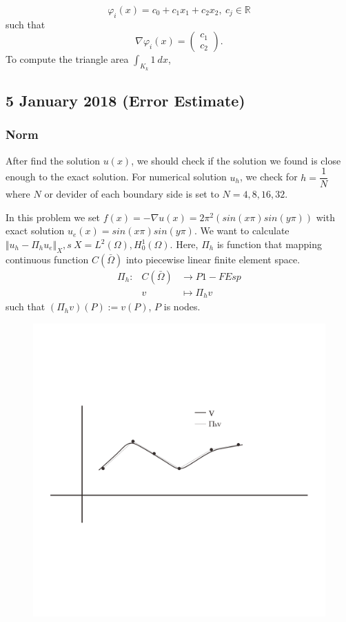 \documentclass[a4paper,10pt]{article}
\begin{document}
\[ \varphi_{i}(x) = c_{0} + c_{1}x_{1} +  c_{2}x_{2}, \ c_{j} \in \mathbb{R} \]
such that
\[ \nabla \varphi_{i}(x) = \begin{pmatrix}
c_{1} \\ c_{2}
\end{pmatrix}.  \]
To compute the triangle area $ \int_{K_{k}} 1 \ dx $,


\subsection{5 January 2018 (Error Estimate)}
\subsubsection{Norm}
After find the solution $ u(x) $, we should check if the solution we found is close enough to the exact solution. For numerical solution $ u_{h} $, we check for $ h = \dfrac{1}{N} $ where $ N $  or devider of each boundary side is set to $ N = 4,8,16,32 $.

In this problem we set $ f(x) = -\nabla u(x) = 2 \pi^2(sin(x\pi)sin(y\pi))$ with exact solution $ u_{e}(x) = sin(x\pi)sin(y\pi) $. We want to calculate $ \Vert u_{h}-\Pi_{h}u_{e} \Vert_{X} ,s \ X = L^2(\Omega), H_{0}^{1}(\Omega)$. Here, $ \Pi_{h} $ is function that mapping continuous function $ C(\bar{\Omega}) $ into piecewise linear finite element space.
\begin{eqnarray}\nonumber
\Pi_{h} : & C(\bar{\Omega}) & \rightarrow P1-FEsp \\ \nonumber
& v & \mapsto \Pi_{h}v
\end{eqnarray}
such that $ (\Pi_{h}v)(P) := v(P) $, $ P $ is nodes.

\begin{figure}[h!]
	\centering
	\includegraphics[width=0.7\linewidth]{picture/grafik1}
	\caption{}
	\label{fig:grafik1}
\end{figure}
\end{document}
